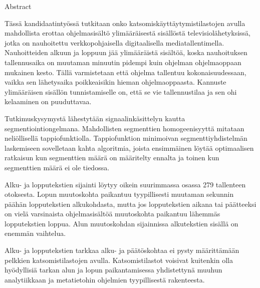 %
%

\begin{enabstract}
Abstract
\end{enabstract}

\begin{fiabstract}

Tässä kandidaatintyössä tutkitaan onko katsomiskäyttäytymistilastojen avulla mahdollista erottaa ohjelmasisältö ylimääräisestä sisällöstä televisiolähetyksissä, jotka on nauhoitettu verkkopohjaisella digitaalisella mediatallentimella. Nauhoitteiden alkuun ja loppuun jää ylimääräistä sisältöä, koska nauhoituksen tallennusaika on muutaman minuutin pidempi kuin ohjelman ohjelmaoppaan mukainen kesto. Tällä varmistetaan että ohjelma tallentuu kokonaisuudessaan, vaikka sen lähetysaika poikkeaisikin hieman ohjelmaoppaasta.
Kannuste ylimääräisen sisällön tunnistamiselle on, että se vie tallennustilaa ja sen ohi kelaaminen on puuduttavaa.

Tutkimuskysymystä lähestytään signaalinkäsittelyn kautta segmentiointiongelmana. Mahdollisten segmenttien homogeenisyyttä mitataan neliöllisellä tappiofunktiolla. 
Tappiofunktion minimoivan segmenttiyhdistelmän laskemiseen sovelletaan kahta algoritmia, joista ensimmäinen löytää optimaalisen ratkaisun kun segmenttien määrä on määritelty ennalta ja toinen kun segmenttien määrä ei ole tiedossa.

Alku- ja lopputekstien sijainti löytyy oikein suurimmassa osassa 279 tallenteen otoksesta. Lopun muutoskohta paikantuu tyypillisesti muutaman sekunnin päähän lopputekstien alkukohdasta, mutta jos lopputekstien aikana tai päätteeksi on vielä varsinaista ohjelmasisältöä muutoskohta paikantuu lähemmäs lopputekstien loppua. Alun muutoskohdan sijainnissa alkutekstien sisällä on enemmän vaihtelua.

Alku- ja lopputekstien tarkkaa alku- ja päätöskohtaa ei pysty määrittämään pelkkien katsomistilastojen avulla. Katsomistilastot voisivat kuitenkin olla hyödyllisiä tarkan alun ja lopun paikantamisessa yhdistettynä muuhun analytiikkaan ja metatietohin ohjelmien tyypillisestä rakenteesta.

\end{fiabstract}

